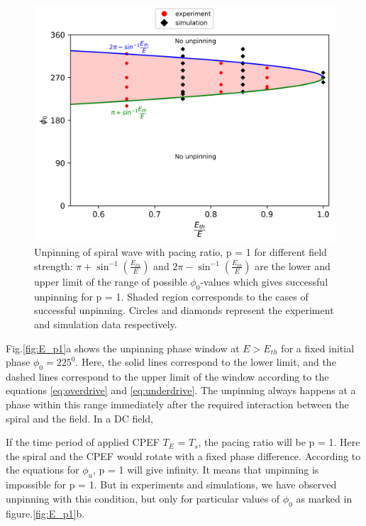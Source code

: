\documentclass[%
 preprint,
 amsmath,amssymb,
 aps,
]{revtex4-2}
\begin{document}
\begin{figure}[H]
    \centering
    \includegraphics{p1.png}
    \caption{Unpinning of spiral wave with pacing ratio, p = 1 for different field strength: $\pi+{\sin^{-1}}{(\frac{E_{th}}{E})}$ and $2\pi-{\sin^{-1}}{(\frac{E_{th}}{E})}$ are the lower and upper limit of 
    the range of possible ${\phi}_0$-values which gives successful unpinning for p = 1. Shaded region corresponds to the cases of successful unpinning.
    Circles and diamonds represent the experiment and simulation data respectively.}
    \label{fig:unpinning_p1}
\end{figure}
\fi
Fig.\ref{fig:E_p1}a shows the unpinning phase window at $E>E_{th}$ for a fixed initial phase $\phi_0 = 225^0$. Here, the solid lines correspond to the lower limit, and the dashed lines correspond to the upper limit of the window according to the equations \ref{eq:overdrive} and \ref{eq:underdrive}. The unpinning always happens at a phase within this range immediately after the required interaction between the spiral and the field. In a DC field, 

If the time period of applied CPEF $T_E$ = $T_s$, the pacing ratio will be p = 1. Here the spiral and the CPEF would rotate with a fixed phase difference. According to the equations for $\phi_u$, p = 1 will give infinity. It means that unpinning is impossible for p = 1. But in experiments and simulations, we have observed unpinning with this condition, but only for particular values of $\phi_0$ as marked in figure.\ref{fig:E_p1}b. 
\end{document}
